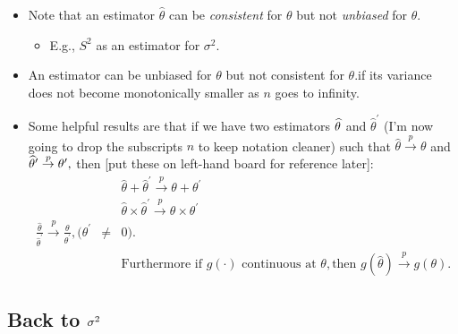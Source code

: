 \documentclass[11pt]{article}
\begin{document}
\begin{itemize}
\item Note that an estimator $\widehat{\theta }$ can be \textit{consistent }%
for $\theta $ but not \textit{unbiased} for $\theta .$ \ 

\begin{itemize}
\item E.g., $S^{2}$ as an estimator for $\sigma ^{2}.$
\end{itemize}

\item An estimator can be unbiased for $\theta $ but not consistent for $%
\theta .$if its variance does not become monotonically smaller as $n$ goes
to infinity.

\item Some helpful results are that if we have two estimators $\widehat{%
\theta }$ and $\widehat{\theta }^{\prime }$ (I'm now going to drop the
subscripts $n$ to keep notation cleaner) such that $\widehat{\theta }\overset%
{p}{\rightarrow }\theta $ and $\widehat{\theta }^{\prime }\overset{p}{%
\rightarrow }\theta ^{\prime },$ then [put these on left-hand board for
reference later]:%
\begin{eqnarray*}
&&\widehat{\theta }+\widehat{\theta }^{\prime }\overset{p}{\rightarrow }%
\theta +\theta ^{\prime } \\
&&\widehat{\theta }\times \widehat{\theta }^{\prime }\overset{p}{\rightarrow 
}\theta \times \theta ^{\prime } \\
\frac{\widehat{\theta }}{\widehat{\theta }^{\prime }}\overset{p}{\rightarrow 
}\frac{\theta }{\theta ^{\prime }},(\theta ^{\prime } &\neq &0). \\
&&\text{Furthermore if }g(\cdot )\text{ continuous at }\theta ,\text{then }g(%
\widehat{\theta })\overset{p}{\rightarrow }g(\theta ).
\end{eqnarray*}
\end{itemize}

\subsection{Back to $\protect\sigma ^{2}$}
\end{document}
